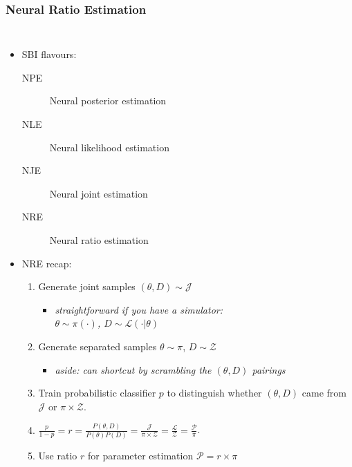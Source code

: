 \documentclass[aspectratio=169]{beamer}
\begin{document}
\begin{frame}
    \frametitle{Neural Ratio Estimation}
    \begin{columns}
        \begin{itemize}
            \item SBI flavours:
                {\small
                    \begin{description}
                        \item[NPE] Neural posterior estimation
                        \item[NLE] Neural likelihood estimation
                        \item[NJE] Neural joint estimation
                        \item[NRE] Neural ratio estimation
                    \end{description}
                }
            \item NRE recap:
                \begin{enumerate}
                    \item Generate joint samples $(\theta,D)\sim\mathcal{J}$
                        \begin{itemize}
                            \item \textit{straightforward if you have a simulator:\\ $\theta\sim\pi(\cdot)$, $D\sim\mathcal{L}(\cdot|\theta)$}
                        \end{itemize}
                    \item Generate separated samples $\theta\sim\pi$, $D\sim\mathcal{Z}$
                        \begin{itemize}
                            \item \textit{aside: can shortcut by scrambling the $(\theta,D)$ pairings}
                        \end{itemize}
                    \item Train probabilistic classifier $p$ to distinguish whether $(\theta,D)$ came from $\mathcal{J}$ or $\pi\times\mathcal{Z}$.
                    \item $\frac{p}{1-p} = r = \frac{P(\theta,D)}{P(\theta)P(D)} 
                        =
                        \frac{\mathcal{J}}{\pi\times\mathcal{Z}} = \frac{\mathcal{L}}{\mathcal{Z}} = \frac{\mathcal{P}}{\pi}$.
                    \item Use ratio $r$ for parameter estimation $\mathcal{P} = r\times\pi$

\end{enumerate}
\end{itemize}
\end{columns}
\end{frame}
\end{document}
